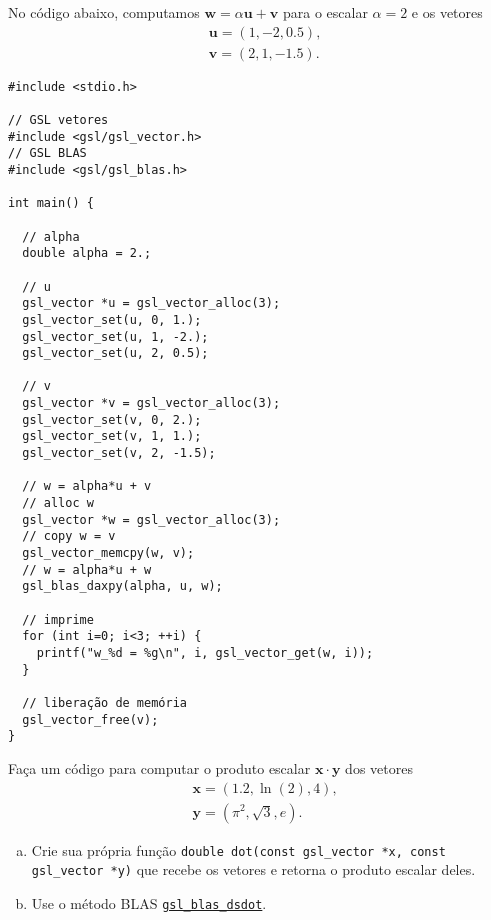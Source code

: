 \documentclass[12pt]{article}
\begin{document}
\begin{ex}
  No código abaixo, computamos $\pmb{w} = \alpha \pmb{u} + \pmb{v}$ para o escalar $\alpha = 2$ e os vetores
  \begin{equation}
    \begin{aligned}
      &\pmb{u} = (1, -2, 0.5),\\
      &\pmb{v} = (2, 1, -1.5).
    \end{aligned}
  \end{equation}

\begin{lstlisting}[caption=axpy.cc]
#include <stdio.h>

// GSL vetores
#include <gsl/gsl_vector.h>
// GSL BLAS
#include <gsl/gsl_blas.h>

int main() {

  // alpha
  double alpha = 2.;
  
  // u
  gsl_vector *u = gsl_vector_alloc(3);
  gsl_vector_set(u, 0, 1.);
  gsl_vector_set(u, 1, -2.);
  gsl_vector_set(u, 2, 0.5);

  // v
  gsl_vector *v = gsl_vector_alloc(3);
  gsl_vector_set(v, 0, 2.);
  gsl_vector_set(v, 1, 1.);
  gsl_vector_set(v, 2, -1.5);

  // w = alpha*u + v
  // alloc w
  gsl_vector *w = gsl_vector_alloc(3);
  // copy w = v
  gsl_vector_memcpy(w, v);
  // w = alpha*u + w
  gsl_blas_daxpy(alpha, u, w);
  
  // imprime
  for (int i=0; i<3; ++i) {
    printf("w_%d = %g\n", i, gsl_vector_get(w, i));
  }
  
  // liberação de memória
  gsl_vector_free(v);
}
\end{lstlisting}
\end{ex}

\begin{exr}
  Faça um código para computar o produto escalar $\pmb{x}\cdot\pmb{y}$ dos vetores
  \begin{align}
    &\pmb{x} = (1.2, \ln(2), 4),\\
    &\pmb{y} = (\pi^2, \sqrt{3}, e).
  \end{align}
  \begin{enumerate}[a)]
  \item Crie sua própria função \lstinline+double dot(const gsl_vector *x, const gsl_vector *y)+ que recebe os vetores e retorna o produto escalar deles.
  \item Use o método BLAS \href{https://www.gnu.org/software/gsl/doc/html/blas.html\#c.gsl_blas_dsdot}{\lstinline+gsl_blas_dsdot+}.
  \end{enumerate}
\end{exr}
\end{document}
